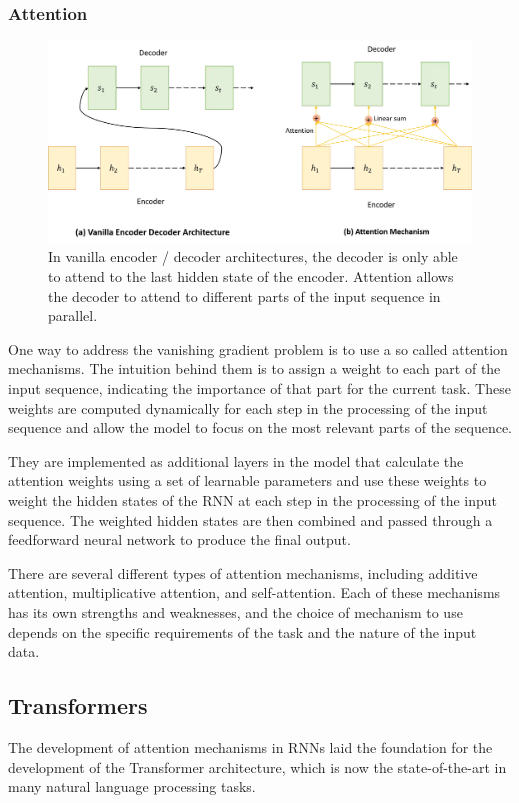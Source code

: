\subsubsection{Attention}
\begin{figure}[h]
    \includegraphics[width=\linewidth]{chapters/NLP/figures/attention.png}
    \caption{In vanilla encoder / decoder architectures, the decoder is only able to attend to the last hidden state of the encoder. Attention allows the decoder to attend to different parts of the input sequence in parallel.}
    \label{fig:attention}
\end{figure}
One way to address the vanishing gradient problem is to use a so called attention mechanisms.
The intuition behind them is to assign a weight to each part of the input sequence, indicating the importance of that part for the current task.
These weights are computed dynamically for each step in the processing of the input sequence and allow the model to focus on the most relevant parts of the sequence.

They are implemented as additional layers in the model that calculate the attention weights using a set of learnable parameters and use these weights to weight the hidden states of the RNN at each step in the processing of the input sequence.
The weighted hidden states are then combined and passed through a feedforward neural network to produce the final output.

There are several different types of attention mechanisms, including additive attention, multiplicative attention, and self-attention. Each of these mechanisms has its own strengths and weaknesses, and the choice of mechanism to use depends on the specific requirements of the task and the nature of the input data.


\subsection{Transformers}
The development of attention mechanisms in RNNs laid the foundation for the development of the Transformer architecture, which is now the state-of-the-art in many natural language processing tasks.

